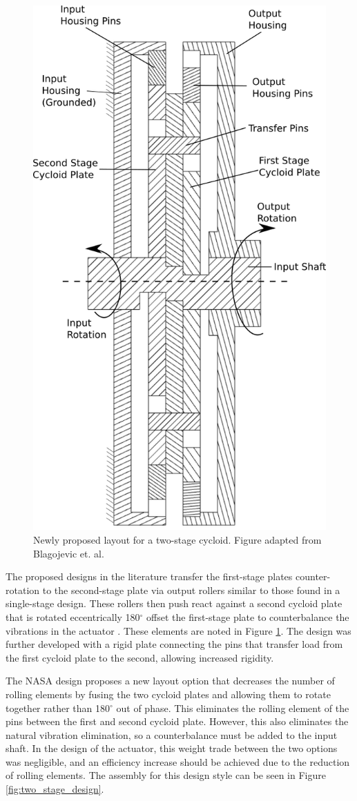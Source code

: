 \begin{figure}[!b]
	\centering
	\includegraphics[width=0.48\linewidth]{fig/new_layout}
   \caption{Newly proposed layout for a two-stage cycloid. Figure adapted from Blagojevic et. al. \cite{ref:new_two_stage}}
   \label{fig:two_stage_simple_cross}
\end{figure}

The proposed designs in the literature transfer the first-stage plates counter-rotation to the second-stage plate via output rollers similar to those found in a single-stage design. These rollers then push react against a second cycloid plate that is rotated eccentrically 180$^\circ$ offset the first-stage plate to counterbalance the vibrations in the actuator \cite{ref:new_two_stage}. These elements are noted in Figure \ref{fig:two_stage_simple_cross}. The design was further developed with a rigid plate connecting the pins that transfer load from the first cycloid plate to the second, allowing increased rigidity. 

The NASA design proposes a new layout option that decreases the number of rolling elements by fusing the two cycloid plates and allowing them to rotate together rather than 180$^\circ$ out of phase. This eliminates the rolling element of the pins between the first and second cycloid plate. However, this also eliminates the natural vibration elimination, so a counterbalance must be added to the input shaft. In the design of the actuator, this weight trade between the two options was negligible, and an efficiency increase should be achieved due to the reduction of rolling elements. The assembly for this design style can be seen in Figure \ref{fig:two_stage_design}.

